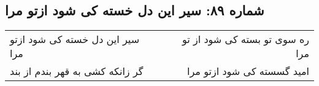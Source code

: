 \begin{center}
\section*{شماره ۸۹: سیر این دل خسته کی شود ازتو مرا}
\label{sec:089}
\begin{longtable}{l p{0.5cm} r}
سیر این دل خسته کی شود ازتو مرا
&&
ره سوی تو بسته کی شود از تو مرا
\\
گر زانکه کشی به قهر بندم از بند
&&
امید گسسته کی شود ازتو مرا
\\
\end{longtable}
\end{center}
